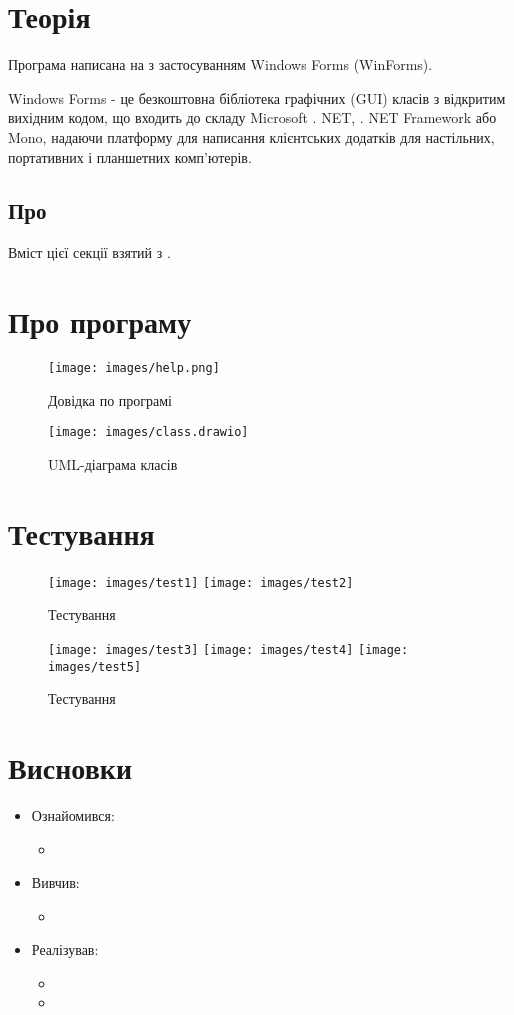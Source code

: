 \section{Теорія}
Програма написана на  з застосуванням Windows Forms (WinForms).

Windows Forms - це безкоштовна бібліотека графічних (GUI) класів з
відкритим вихідним кодом, що входить до складу Microsoft . NET, . NET Framework
або Mono, надаючи платформу для написання клієнтських додатків для настільних,
портативних і планшетних комп'ютерів.
\subsection{Про }
Вміст цієї секції взятий з \cite{mslearn}.
\begin{description}
	\item[\code{}]
\end{description}

\section{Про програму}
\begin{figure}[htb]
	\centering
	\texttt{[image: images/help.png]}
	\caption{Довідка по програмі}
	\label{fig:help}
\end{figure}
\begin{figure}[htb]
	\centering
	\texttt{[image: images/class.drawio]}
	\caption{UML-діаграма класів}
	\label{fig:classdiagram}
\end{figure}

\section{Тестування}
\begin{figure}[htb]
	\centering
	\texttt{[image: images/test1]}
	\texttt{[image: images/test2]}
	\caption{Тестування}
	\label{fig:tag}
\end{figure}
\begin{figure}[htb]
	\ContinuedFloat\centering
	\texttt{[image: images/test3]}
	\texttt{[image: images/test4]}
	\texttt{[image: images/test5]}
	\caption{Тестування}
	\label{fig:tag}
\end{figure}

\section{Висновки}
\begin{itemize}
	\item Ознайомився:
		\begin{itemize}
			\item
		\end{itemize}
	\item Вивчив:
		\begin{itemize}
			\item
		\end{itemize}
	\item Реалізував:
		\begin{itemize}
			\item
			\item
		\end{itemize}
\end{itemize}